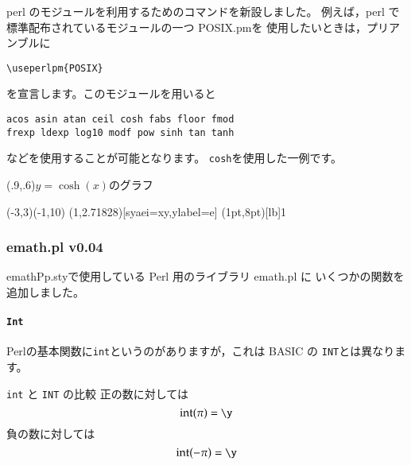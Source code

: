 \subsubsection{}
perl のモジュールを利用するためのコマンドを新設しました。
例えば，perl で標準配布されているモジュールの一つ \textsf{POSIX.pm}を
使用したいときは，プリアンブルに
\begin{jquote}
\begin{verbatim}
\useperlpm{POSIX}
\end{verbatim}
\end{jquote}
を宣言します。このモジュールを用いると
\begin{jquote}
\begin{verbatim}
acos asin atan ceil cosh fabs floor fmod
frexp ldexp log10 modf pow sinh tan tanh
\end{verbatim}
\end{jquote}
などを使用することが可能となります。
\texttt{cosh}を使用した一例です。

\begin{showEx}(.9,.6){$y=\cosh(x)$のグラフ}
\begin{zahyou}[ul=6mm,Ueyohaku=1zh](-3,3)(-1,10)
  \def\E{(1,2.71828)}\Put\E[syaei=xy,ylabel=e]{}
  (1pt,8pt)[lb]{1}
  \Put{}
  \Put{}
  {\Thicklines{}\Put{}}
\end{zahyou}
\end{showEx}

\subsubsection{emath.pl v0.04}
\textsf{emathPp.sty}で使用している Perl 用のライブラリ \textsf{emath.pl} に
いくつかの関数を追加しました。

\paragraph{\texttt{Int}}
\textsf{Perl}の基本関数に\texttt{int}というのがありますが，これは BASIC の
\texttt{INT}とは異なります。

\begin{showEx}{\texttt{int} と \texttt{INT} の比較}
正の数に対しては
\y
\[ \mathrm{int}(\pi)=\y \]
負の数に対しては
\y
\[ \mathrm{int}(-\pi)=\y \]
\end{showEx}
\bigskip

